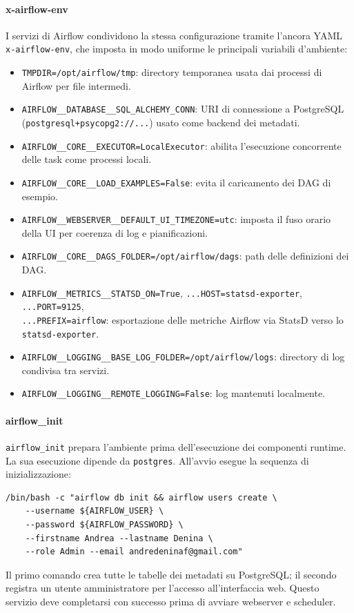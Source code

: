 \paragraph{x-airflow-env}
I servizi di Airflow condividono la stessa configurazione tramite l’ancora YAML\\ \texttt{x-airflow-env}, che imposta in modo uniforme le principali variabili d’ambiente:
\begin{itemize}
  \item \texttt{TMPDIR=/opt/airflow/tmp}: directory temporanea usata dai processi di Airflow per file intermedi.
  \item \texttt{AIRFLOW\_\_DATABASE\_\_SQL\_ALCHEMY\_CONN}: URI di connessione a PostgreSQL \\ (\texttt{postgresql+psycopg2://...}) usato come backend dei metadati.
  \item \texttt{AIRFLOW\_\_CORE\_\_EXECUTOR=LocalExecutor}: abilita l’esecuzione concorrente delle task come processi locali.
  \item \texttt{AIRFLOW\_\_CORE\_\_LOAD\_EXAMPLES=False}: evita il caricamento dei DAG di esempio.
  \item \texttt{AIRFLOW\_\_WEBSERVER\_\_DEFAULT\_UI\_TIMEZONE=utc}: imposta il fuso orario della UI per coerenza di log e pianificazioni.
  \item \texttt{AIRFLOW\_\_CORE\_\_DAGS\_FOLDER=/opt/airflow/dags}: path delle definizioni dei DAG.
  \item \texttt{AIRFLOW\_\_METRICS\_\_STATSD\_ON=True}, \texttt{...HOST=statsd-exporter}, \texttt{...PORT=9125}, \texttt{\\...PREFIX=airflow}: esportazione delle metriche Airflow via StatsD verso lo \texttt{statsd-exporter}.
  \item \texttt{AIRFLOW\_\_LOGGING\_\_BASE\_LOG\_FOLDER=/opt/airflow/logs}: directory di log condivisa tra servizi.
  \item \texttt{AIRFLOW\_\_LOGGING\_\_REMOTE\_LOGGING=False}: log mantenuti localmente.
\end{itemize}

\paragraph{airflow\_init}
\texttt{airflow\_init} prepara l’ambiente prima dell’esecuzione dei componenti runtime. La  sua esecuzione dipende da \texttt{postgres}. All’avvio esegue la sequenza di inizializzazione:
\begin{verbatim}
/bin/bash -c "airflow db init && airflow users create \
    --username ${AIRFLOW_USER} \
    --password ${AIRFLOW_PASSWORD} \
    --firstname Andrea --lastname Denina \
    --role Admin --email andredeninaf@gmail.com"
\end{verbatim}
Il primo comando crea tutte le tabelle dei metadati su PostgreSQL; il secondo registra un utente amministratore per l’accesso all’interfaccia web. Questo servizio deve completarsi con successo prima di avviare webserver e scheduler.

